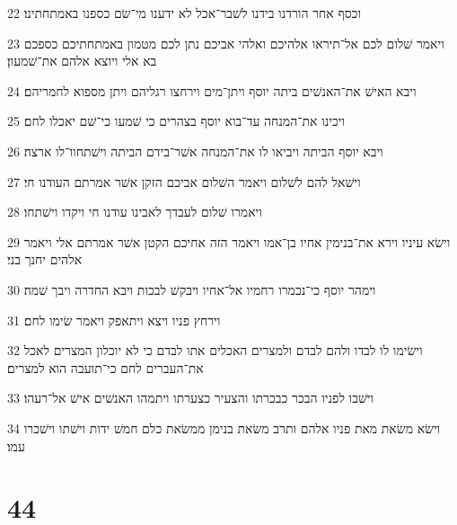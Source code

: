 \par 22 וכסף אחר הורדנו בידנו לשׁבר־אכל לא ידענו מי־שׂם כספנו באמתחתינו׃
\par 23 ויאמר שׁלום לכם אל־תיראו אלהיכם ואלהי אביכם נתן לכם מטמון באמתחתיכם כספכם בא אלי ויוצא אלהם את־שׁמעון׃
\par 24 ויבא האישׁ את־האנשׁים ביתה יוסף ויתן־מים וירחצו רגליהם ויתן מספוא לחמריהם׃
\par 25 ויכינו את־המנחה עד־בוא יוסף בצהרים כי שׁמעו כי־שׁם יאכלו לחם׃
\par 26 ויבא יוסף הביתה ויביאו לו את־המנחה אשׁר־בידם הביתה וישׁתחוו־לו ארצה׃
\par 27 וישׁאל להם לשׁלום ויאמר השׁלום אביכם הזקן אשׁר אמרתם העודנו חי׃
\par 28 ויאמרו שׁלום לעבדך לאבינו עודנו חי ויקדו וישׁתחו׃
\par 29 וישׂא עיניו וירא את־בנימין אחיו בן־אמו ויאמר הזה אחיכם הקטן אשׁר אמרתם אלי ויאמר אלהים יחנך בני׃
\par 30 וימהר יוסף כי־נכמרו רחמיו אל־אחיו ויבקשׁ לבכות ויבא החדרה ויבך שׁמה׃
\par 31 וירחץ פניו ויצא ויתאפק ויאמר שׂימו לחם׃
\par 32 וישׂימו לו לבדו ולהם לבדם ולמצרים האכלים אתו לבדם כי לא יוכלון המצרים לאכל את־העברים לחם כי־תועבה הוא למצרים׃
\par 33 וישׁבו לפניו הבכר כבכרתו והצעיר כצערתו ויתמהו האנשׁים אישׁ אל־רעהו׃
\par 34 וישׂא משׂאת מאת פניו אלהם ותרב משׂאת בנימן ממשׂאת כלם חמשׁ ידות וישׁתו וישׁכרו עמו׃

\chapter{44}

